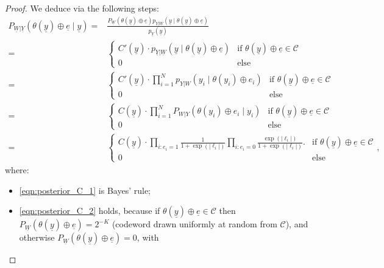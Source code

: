 \documentclass[letterpaper,draftclsnofoot,onecolumn]{IEEEtran}
\begin{document}
\begin{proof}
    We deduce via the following steps:
    \begin{align}
    P_{\underline{W}|\underline{Y}}\left(\theta(\underline{y})\oplus \underline{e} \mid \underline{y}\right) = & \frac{P_{\underline{W}}(\theta(\underline{y})\oplus \underline{e}) p_{\underline{Y}|\underline{W}}\left(\underline{y} \mid \theta(\underline{y})\oplus \underline{e}\right)}{ p_{\underline{Y}}(\underline{y})} \label{eqn:posterior_C_1}\\
    = &  \left\{\begin{array}{ll}
        C'(\underline{y})\cdot p_{\underline{Y}|\underline{W}}\left(\underline{y} \mid \theta(\underline{y})\oplus \underline{e}\right)   & \text{if } \theta(\underline{y})\oplus \underline{e} \in \mathcal{C} \\
        0     & \text{else}
        \end{array} \right. \label{eqn:posterior_C_2}\\
    = & \left\{\begin{array}{ll}
        C'(\underline{y})\cdot \prod_{i=1}^{N} p_{Y|W}\left(y_i \mid \theta(y_i)\oplus e_i\right)   & \text{if } \theta(\underline{y})\oplus \underline{e} \in \mathcal{C} \\
        0     & \text{else}
        \end{array} \right. \label{eqn:posterior_C_3}\\
    = & \left\{\begin{array}{ll}
        C(\underline{y})\cdot \prod_{i=1}^{N} P_{W|Y}\left(\theta(y_i)\oplus e_i \mid y_i\right)   & \text{if } \theta(\underline{y})\oplus \underline{e} \in \mathcal{C} \\
        0     & \text{else}
        \end{array} \right. \label{eqn:posterior_C_4}\\
    = & \left\{\begin{array}{ll}
        C(\underline{y})\cdot \prod_{i:e_i = 1}\frac{1}{1+\exp(|\ell_i|)}\prod_{i:e_i = 0}\frac{\exp(|\ell_i|)}{1+\exp(|\ell_i|)}.   & \text{if } \theta(\underline{y})\oplus \underline{e} \in \mathcal{C} \\
        0     & \text{else}
        \end{array} \right. ,\label{eqn:posterior_C_5}
\end{align}
where:
\begin{itemize}
    \item \eqref{eqn:posterior_C_1} is Bayes' rule;
    \item \eqref{eqn:posterior_C_2} holds, because if $\theta(\underline{y})\oplus \underline{e} \in \mathcal{C}$ then $P_{\underline{W}}(\theta(\underline{y})\oplus \underline{e}) = 2^{-K}$ (codeword drawn uniformly at random from $\mathcal{C}$), and otherwise $P_{\underline{W}}(\theta(\underline{y})\oplus \underline{e}) = 0$, with

\end{itemize}
\end{proof}
\end{document}
